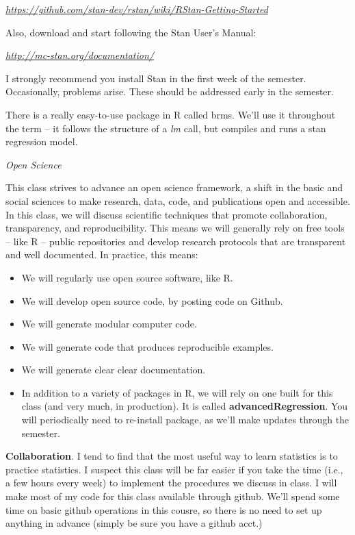 \documentclass[
]{book}
\begin{document}
\href{https://github.com/stan-dev/rstan/wiki/RStan-Getting-Started}{\emph{https://github.com/stan-dev/rstan/wiki/RStan-Getting-Started}}

Also, download and start following the Stan User's Manual:

\href{http://mc-stan.org/documentation/}{\emph{http://mc-stan.org/documentation/}}

I strongly recommend you install Stan in the first week of the semester. Occasionally, problems arise. These should be addressed early in the semester.

There is a really easy-to-use package in R called brms. We'll use it throughout the term -- it follows the structure of a \emph{lm} call, but compiles and runs a stan regression model.

\emph{Open Science}

This class strives to advance an open science framework, a shift in the basic and social sciences to make research, data, code, and publications open and accessible. In this class, we will discuss scientific techniques that promote collaboration, transparency, and reproducibility. This means we will generally rely on free tools -- like R -- public repositories and develop research protocols that are transparent and well documented. In practice, this means:

\begin{itemize}
\item
  We will regularly use open source software, like R.
\item
  We will develop open source code, by posting code on Github.
\item
  We will generate modular computer code.
\item
  We will generate code that produces reproducible examples.
\item
  We will generate clear clear documentation.
\item
  In addition to a variety of packages in R, we will rely on one built for this class (and very much, in production). It is called \textbf{advancedRegression}. You will periodically need to re-install package, as we'll make updates through the semester.
\end{itemize}

\textbf{Collaboration}. I tend to find that the most useful way to learn statistics is to practice statistics. I suspect this class will be far easier if you take the time (i.e., a few hours every week) to implement the procedures we discuss in class. I will make most of my code for this class available through github. We'll spend some time on basic github operations in this cousre, so there is no need to set up anything in advance (simply be sure you have a github acct.)
\end{document}

